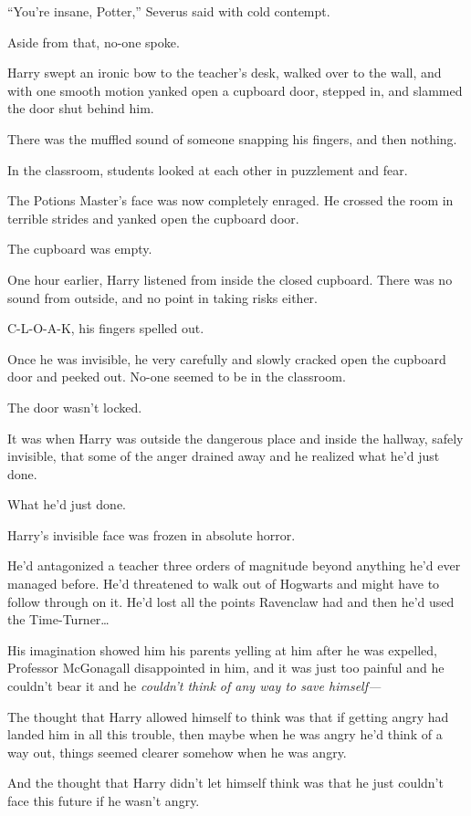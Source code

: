 “You’re insane, Potter,” Severus said with cold contempt.

Aside from that, no-one spoke.

Harry swept an ironic bow to the teacher’s desk, walked over to the wall, and with one smooth motion yanked open a cupboard door, stepped in, and slammed the door shut behind him.

There was the muffled sound of someone snapping his fingers, and then nothing.

In the classroom, students looked at each other in puzzlement and fear.

The Potions Master’s face was now completely enraged. He crossed the room in terrible strides and yanked open the cupboard door.

The cupboard was empty.

\later

One hour earlier, Harry listened from inside the closed cupboard. There was no sound from outside, and no point in taking risks either.

C-L-O-A-K, his fingers spelled out.

Once he was invisible, he very carefully and slowly cracked open the cupboard door and peeked out. No-one seemed to be in the classroom.

The door wasn’t locked.

It was when Harry was outside the dangerous place and inside the hallway, safely invisible, that some of the anger drained away and he realized what he’d just done.

What he’d just done.

Harry’s invisible face was frozen in absolute horror.

He’d antagonized a teacher three orders of magnitude beyond anything he’d ever managed before. He’d threatened to walk out of Hogwarts and might have to follow through on it. He’d lost all the points Ravenclaw had and then he’d used the Time-Turner…

His imagination showed him his parents yelling at him after he was expelled, Professor McGonagall disappointed in him, and it was just too painful and he couldn’t bear it and he \emph{couldn’t think of any way to save himself—}

The thought that Harry allowed himself to think was that if getting angry had landed him in all this trouble, then maybe when he was angry he’d think of a way out, things seemed clearer somehow when he was angry.

And the thought that Harry didn’t let himself think was that he just couldn’t face this future if he wasn’t angry.

